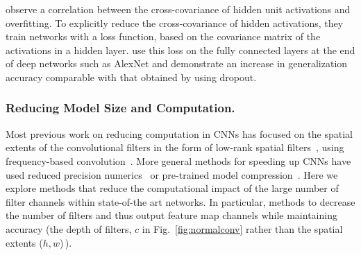 \documentclass[thesis]{subfiles}
\begin{document}
	\citet{journals/corr/CogswellAGZB15} observe a correlation between the cross-covariance of hidden unit activations and overfitting. To explicitly reduce the cross-covariance of hidden activations, they train networks with a loss function, based on the covariance matrix of the activations in a hidden layer. \citet{journals/corr/CogswellAGZB15} use this loss on the fully connected layers at the end of deep networks such as AlexNet and demonstrate an increase in generalization accuracy comparable with that obtained by using dropout.
	
	
	
	\subsubsection{Reducing Model Size and Computation.}
	\label{regularizingstructure}
	Most previous work on reducing computation in CNNs has focused on the spatial extents of the convolutional filters in the form of low-rank spatial filters~\citep{mamalet2012simplifying,journals/corr/JaderbergVZ14, journals/pami/SironiTRLF15, journals/corr/LebedevGROL14, Ioannou2015lowrank}, using frequency-based convolution~\cite{mathieu2013fast,rippel2015spectral}. More general methods for speeding up CNNs have used reduced precision numerics~\cite{1502.02551v1} or pre-trained model compression~\cite{conf/icml/ChenWTWC15,KimPYCYS15}. Here we explore methods that reduce the computational impact of the large number of filter channels within state-of-the art networks. In particular, methods to decrease the number of filters and thus output feature map channels while maintaining accuracy (\ie the depth of filters, $c$ in Fig.~\ref{fig:normalconv} rather than the spatial extents ($h, w$)\,).
	
\end{document}
